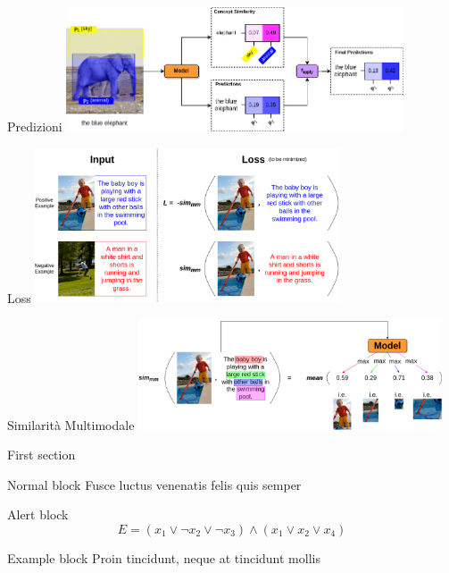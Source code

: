 \documentclass{beamer}
\begin{document}
\begin{frame}{Predizioni}
  \centering
  \includegraphics[width=10cm]{images/predictions.png}
\end{frame}

\begin{frame}{Loss}
  \centering
  \includegraphics[width=9cm]{images/loss.png}
\end{frame}

\begin{frame}{Similarità Multimodale}
  \centering
  \includegraphics[width=9cm]{images/sim-mm.png}
\end{frame}

\begin{frame}{First section}
  \begin{block}{Normal block}
    Fusce luctus venenatis felis quis semper
  \end{block}

  \begin{alertblock}{Alert block}
    $$ E = (x_1 \vee \neg x_2 \vee \neg x_3) \wedge (x_1 \vee x_2 \vee x_4) $$
  \end{alertblock}

  \begin{exampleblock}{Example block}
    Proin tincidunt, neque at tincidunt mollis
  \end{exampleblock}
\end{frame}
\end{document}
